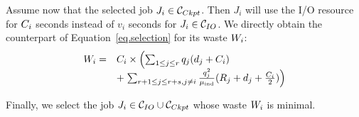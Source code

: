 Assume now that the selected job $J_{i} \in \mathcal{C}_{Ckpt}$. Then $J_{i}$
will use the I/O resource for $C_{i}$ seconds instead of $v_{i}$
seconds for $J_{i} \in \mathcal{C}_{IO}$. We directly obtain the counterpart
of Equation~\eqref{eq.selection} for its waste $W_{i}$:
 \begin{equation}
\label{eq.selection2}
 \begin{array}{ll}
 W_{i} = & C_{i} \times \left( \sum_{1 \leq j \leq r} q_{j} (d_{j} + C_{i}) \right.\\
& + \left. \sum_{r+1 \leq j \leq r+s, j\neq i}   \frac{q^{2}_{j}}{\mu_{\text{ind}}} (R_{j} + d_{j} + \frac{C_{i}}{2}) \right)
 \end{array}
\end{equation}

Finally, we select the job $J_{i} \in \mathcal{C}_{IO} \cup \mathcal{C}_{Ckpt}$
whose waste $W_{i}$ is minimal. 